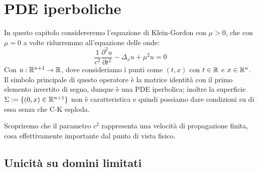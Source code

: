 \documentclass{book}
\begin{document}
\chapter{PDE iperboliche}

In questo capitolo considereremo l'equazione di Klein-Gordon con $\mu > 0$, che con $\mu = 0$ a volte ridurremmo all'equazione delle onde:
\[\frac{1}{c^2}\frac{\partial^2 u}{\partial t^2} - \Delta_x u + \mu^2 u = 0\]
Con $u: \mathbb{R}^{n+1}\to \mathbb{R}$, dove consideriamo i punti come $(t,x)$ con $t \in \mathbb{R}$ e $x \in\mathbb{R}^n$.
Il simbolo principale di questo operatore è la matrice identità con il primo elemento invertito di segno, dunque è una PDE iperbolica; inoltre la superficie $\Sigma := \{(0,x)\in \mathbb{R}^{n+1}\}$ non è caratteristica \Nick e quindi possiamo dare condizioni su di essa senza che C-K esploda.

Scopriremo che il parametro $c^2$ rappresenta una velocità di propagazione finita, cosa effettivamente importante dal punto di vista fisico.

\section{Unicità su domini limitati}
\end{document}
